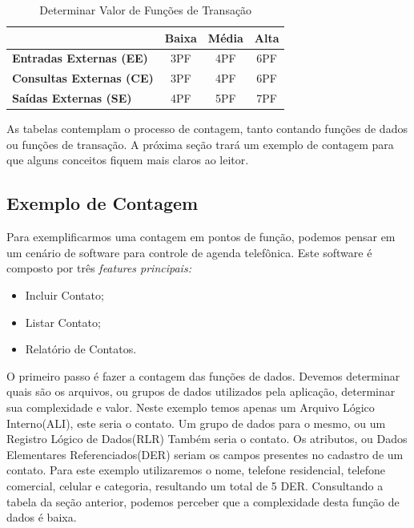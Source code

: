 \begin{table}[H]
\centering
\caption{Determinar Valor de Funções de Transação}
\label{my-label}
\begin{tabular}{|l|c|c|c|}
\hline
\textbf{}                                              & \multicolumn{1}{l|}{\textbf{Baixa}} & \multicolumn{1}{l|}{\textbf{Média}} & \multicolumn{1}{l|}{\textbf{Alta}} \\ \hline
\textbf{Entradas Externas (EE)}                        & 3PF                                 & 4PF                                 & 6PF                                \\ \hline
\multicolumn{1}{|c|}{\textbf{Consultas Externas (CE)}} & 3PF                                 & 4PF                                 & 6PF                                \\ \hline
\textbf{Saídas Externas (SE)}                          & 4PF                                 & 5PF                                 & 7PF                                \\ \hline
\end{tabular}
\end{table}

As tabelas contemplam o processo de contagem, tanto contando funções de dados ou funções de transação. A próxima seção trará um exemplo de contagem para que alguns conceitos fiquem mais claros ao leitor.

\subsection{Exemplo de Contagem}

Para exemplificarmos uma contagem em pontos de função, podemos pensar em um cenário de software para controle de agenda telefônica. Este software é composto por três \textit{features principais:}

\begin{itemize}
	\item Incluir Contato;
	\item Listar Contato;
	\item Relatório de Contatos.
\end{itemize}

O primeiro passo é fazer a contagem das funções de dados. Devemos determinar quais são os arquivos, ou grupos de dados utilizados pela aplicação, determinar sua complexidade e valor. Neste exemplo temos apenas um Arquivo Lógico Interno(ALI), este seria o contato. Um grupo de dados para o mesmo, ou um Registro Lógico de Dados(RLR) Também seria o contato. Os atributos, ou Dados Elementares Referenciados(DER) seriam os campos presentes no cadastro de um contato. Para este exemplo utilizaremos o nome, telefone residencial, telefone comercial, celular e categoria, resultando um total de 5 DER. Consultando a tabela da seção anterior, podemos perceber que a complexidade desta função de dados é baixa.


